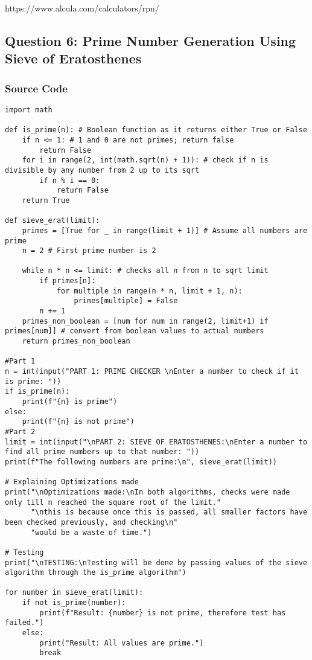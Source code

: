 \documentclass{article}
\begin{document}
https://www.alcula.com/calculators/rpn/

\subsection*{Question 6: Prime Number Generation Using Sieve of Eratosthenes}
\subsubsection*{Source Code}
\begin{lstlisting}
import math

def is_prime(n): # Boolean function as it returns either True or False
    if n <= 1: # 1 and 0 are not primes; return false
        return False
    for i in range(2, int(math.sqrt(n) + 1)): # check if n is divisible by any number from 2 up to its sqrt
        if n % i == 0:
            return False
    return True

def sieve_erat(limit):
    primes = [True for _ in range(limit + 1)] # Assume all numbers are prime
    n = 2 # First prime number is 2

    while n * n <= limit: # checks all n from n to sqrt limit
        if primes[n]:
            for multiple in range(n * n, limit + 1, n):
                primes[multiple] = False
        n += 1
    primes_non_boolean = [num for num in range(2, limit+1) if primes[num]] # convert from boolean values to actual numbers
    return primes_non_boolean

#Part 1
n = int(input("PART 1: PRIME CHECKER \nEnter a number to check if it is prime: "))
if is_prime(n):
    print(f"{n} is prime")
else:
    print(f"{n} is not prime")
#Part 2
limit = int(input("\nPART 2: SIEVE OF ERATOSTHENES:\nEnter a number to find all prime numbers up to that number: "))
print(f"The following numbers are prime:\n", sieve_erat(limit))

# Explaining Optimizations made
print("\nOptimizations made:\nIn both algorithms, checks were made only till n reached the square root of the limit."
      "\nthis is because once this is passed, all smaller factors have been checked previously, and checking\n"
      "would be a waste of time.")

# Testing
print("\nTESTING:\nTesting will be done by passing values of the sieve algorithm through the is_prime algorithm")

for number in sieve_erat(limit):
    if not is_prime(number):
        print(f"Result: {number} is not prime, therefore test has failed.")
    else:
        print("Result: All values are prime.")
        break

\end{lstlisting}
\end{document}
